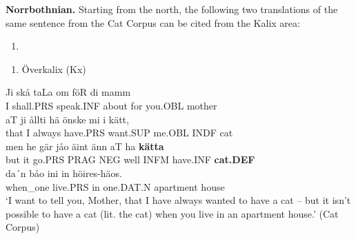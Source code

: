 \textbf{Norrbothnian.} Starting from the north, the following two translations of the same sentence from the Cat Corpus can be cited from the Kalix area:

\begin{enumerate} %
\item 
\end{enumerate} %
\setcounter{listLFOxcviiileveli}{0}
\begin{enumerate} %
\item 
Överkalix (Kx)

\end{enumerate} %
\ea\label{}
\gll Ji  skå  taLa  om  föR  di  mamm\\


I  shall.PRS  speak.INF  about  for  you.OBL  mother\\ %


\ea\label{}
\gll aT  ji  ållti  hä  önske  mi  i  kätt,\\


that  I  always  have.PRS  want.SUP  me.OBL  INDF  cat\\ %


\ea\label{}
\gll men  he  gär  jåo  äint  änn  aT  ha  \textbf{kätta}\\


but  it  go.PRS  PRAG  NEG  well  INFM  have.INF  \textbf{cat.DEF}\\ %


\ea\label{}
\gll da´n  båo  ini  in  höires-häos.\\


when\_one  live.PRS  in  one.DAT.N  apartment house\\ %


‘I want to tell you, Mother, that I have always wanted to have a cat – but it isn’t possible to have a cat (lit. the cat) when you live in an apartment house.’ (Cat Corpus)
\z


